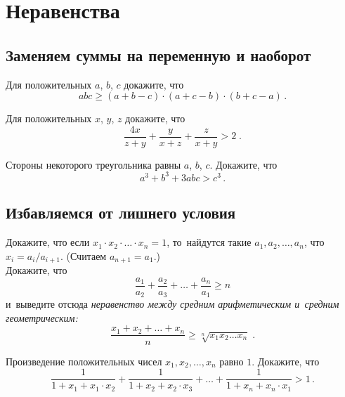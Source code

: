
\section*{Неравенства}



\subsection*{Заменяем суммы на переменную и наоборот}

\begin{problems}

\item
Для положительных $a$, $b$, $c$ докажите, что
\[
    a b c
\geq
    (a + b - c) \cdot (a + c - b) \cdot (b + c - a)
\, . \]

\item
Для положительных $x$, $y$, $z$ докажите, что
\[
    \frac{4 x}{z + y} + \frac{y}{x + z} + \frac{z}{x + y}
>
    2
\; . \]

\item
Стороны некоторого треугольника равны $a$, $b$, $c$.
Докажите, что
\[
    a^3 + b^3 + 3 a b c > c^3
\, . \]

\end{problems}


\subsection*{Избавляемся от лишнего условия}

\begin{problems}

\item
\subproblem
Докажите, что если
\(
    x_1 \cdot x_2 \cdot \ldots \cdot x_n = 1
\), то~найдутся такие $a_1, a_2, \ldots, a_n$, что $x_i = a_i / a_{i+1}$.
(Считаем $a_{n+1} = a_1$.)
\\
\subproblem
Докажите, что
\[
    \frac{a_1}{a_2} + \frac{a_2}{a_3} + \ldots + \frac{a_n}{a_1}
\geq
    n
\]
и~выведите отсюда \emph{неравенство между средним арифметическим и~средним
геометрическим:}
\[
    \frac{x_1 + x_2 + \ldots + x_n}{n}
\geq
    \sqrt[n]{x_1 x_2 \ldots x_n}
\;\text{.} \]

\item
Произведение положительных чисел $x_1, x_2, \ldots, x_n$ равно $1$.
Докажите, что
\[
    \frac{1}{1 + x_1 + x_1 \cdot x_2} +
    \frac{1}{1 + x_2 + x_2 \cdot x_3} +
    \ldots +
    \frac{1}{1 + x_n + x_n \cdot x_1}
>
    1
\, . \]

\end{problems}


